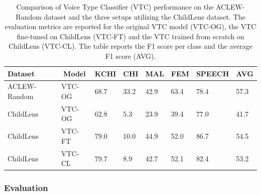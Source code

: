 \documentclass[
  man,floatsintext]{apa6}
\begin{document}
\begin{table}[tbp]

\begin{center}
\begin{threeparttable}

\caption{\label{tab:vtc-results}Comparison of Voice Type Classifier (VTC) performance on the ACLEW-Random dataset and the three setups utilizing the ChildLens dataset. The evaluation metrics are reported for the original VTC model (VTC-OG), the VTC fine-tuned on ChildLens (VTC-FT) and the VTC trained from scratch on ChildLens (VTC-CL). The table reports the F1 score per class and the average F1 score (AVG).
}

\begin{tabular}{llllllll}
\toprule
Dataset & \multicolumn{1}{c}{Model} & \multicolumn{1}{c}{KCHI} & \multicolumn{1}{c}{CHI} & \multicolumn{1}{c}{MAL} & \multicolumn{1}{c}{FEM} & \multicolumn{1}{c}{SPEECH} & \multicolumn{1}{c}{AVG}\\
\midrule
ACLEW-Random & VTC-OG & 68.7 & 33.2 & 42.9 & 63.4 & 78.4 & 57.3\\
ChildLens & VTC-OG & 62.8 & 5.3 & 23.9 & 39.4 & 77.0 & 41.7\\
ChildLens & VTC-FT & 79.0 & 10.0 & 44.9 & 52.0 & 86.7 & 54.5\\
ChildLens & VTC-CL & 79.7 & 8.9 & 42.7 & 52.1 & 82.4 & 53.2\\
\bottomrule
\end{tabular}

\end{threeparttable}
\end{center}

\end{table}

\subsubsection{Evaluation}\label{evaluation-1}
\end{document}
